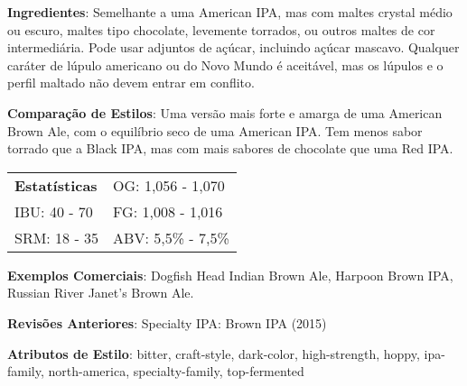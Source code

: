 \textbf{Ingredientes}: Semelhante a uma American IPA, mas com maltes crystal médio ou escuro, maltes tipo chocolate, levemente torrados, ou outros maltes de cor intermediária. Pode usar adjuntos de açúcar, incluindo açúcar mascavo. Qualquer caráter de lúpulo americano ou do Novo Mundo é aceitável, mas os lúpulos e o perfil maltado não devem entrar em conflito.

\textbf{Comparação de Estilos}: Uma versão mais forte e amarga de uma American Brown Ale, com o equilíbrio seco de uma American IPA. Tem menos sabor torrado que a Black IPA, mas com mais sabores de chocolate que uma Red IPA.

\begin{tabular}{@{}p{35mm}p{35mm}@{}}
  \textbf{Estatísticas} & OG: 1,056 - 1,070 \\
  IBU: 40 - 70  & FG: 1,008 - 1,016 \\
  SRM: 18 - 35  & ABV: 5,5\% - 7,5\%
\end{tabular}

\textbf{Exemplos Comerciais}: Dogfish Head Indian Brown Ale, Harpoon Brown IPA, Russian River Janet’s Brown Ale.

\textbf{Revisões Anteriores}: Specialty IPA: Brown IPA (2015)

\textbf{Atributos de Estilo}: bitter, craft-style, dark-color, high-strength, hoppy, ipa-family, north-america, specialty-family, top-fermented
